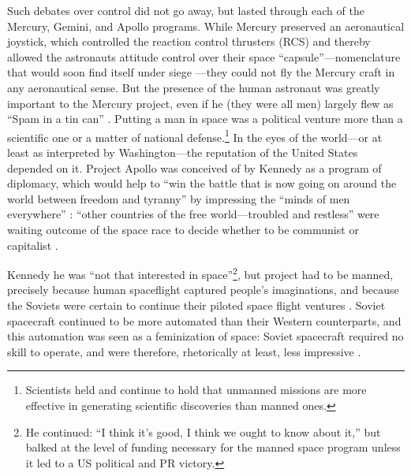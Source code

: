 Such debates over control did not go away, but lasted through each
of the Mercury, Gemini, and Apollo programs. While Mercury preserved an
aeronautical joystick, which controlled the reaction control thrusters
(RCS) and thereby allowed the astronauts attitude control over their
space ``capsule''---nomenclature that would soon find itself under
siege \cite[p. 85]{kauffman}---they could not fly the Mercury craft in any
aeronautical sense. But the presence of the human astronaut was greatly
important to the Mercury project, even if he (they were all men)
largely flew as ``Spam in a tin can'' \cite[p. 60]{wolfe}. Putting a man in
space was a political venture more than a scientific one or a matter
of national defense.\footnote{Scientists held and continue to hold
  that unmanned missions are more effective in generating scientific
  discoveries than manned ones.} In the eyes of the world---or at
least as interpreted by Washington---the
reputation of the United States depended on it. Project Apollo was
conceived of by Kennedy as a program of diplomacy,
which would help to ``win the battle that is now going on around the
world between freedom and tyranny'' by impressing the ``minds of men
everywhere'' \cite{KennedyMay25}: ``other countries of the free
world---troubled and restless'' were waiting outcome of the space race to
decide whether to be communist or capitalist \cite{KennedySep7}. 

Kennedy he was ``not that interested in
space''\footnote{He continued: ``I think it's good, I think we ought
  to know about it,'' but balked at the level of funding necessary
  for the manned space program unless it led to a US political and PR
  victory.}, but project had to
be manned, precisely because human spaceflight captured people's
imaginations, and because the Soviets were certain to continue their
piloted space flight ventures \cite{KennedyNov21}. Soviet spacecraft continued to be
more automated than their Western counterparts, and
this automation was seen as a feminization of space:  Soviet
spacecraft required no skill to operate, and were therefore,
rhetorically at least, less impressive \cite[p. 90]{DM}. 


